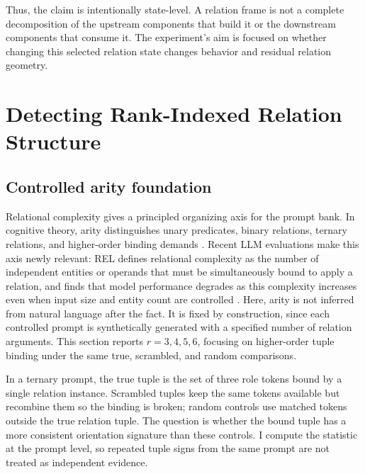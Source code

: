 \documentclass[11pt]{article}
\begin{document}
Thus, the claim is intentionally state-level. A relation frame is not a complete decomposition of the upstream components that build it or the downstream components that consume it. The experiment's aim is focused on whether changing this selected relation state changes behavior and residual relation geometry.

\endgroup

\FloatBarrier

\section{Detecting Rank-Indexed Relation Structure}

\subsection{Controlled arity foundation}

Relational complexity gives a principled organizing axis for the prompt bank. In cognitive theory, arity distinguishes unary predicates, binary relations, ternary relations, and higher-order binding demands \citep{halford1998relational,gentner1983structure}. Recent LLM evaluations make this axis newly relevant: REL defines relational complexity as the number of independent entities or operands that must be simultaneously bound to apply a relation, and finds that model performance degrades as this complexity increases even when input size and entity count are controlled \citep{fesser2026rel}. Here, arity is not inferred from natural language after the fact. It is fixed by construction, since each controlled prompt is synthetically generated with a specified number of relation arguments. This section reports $r=3,4,5,6$, focusing on higher-order tuple binding under the same true, scrambled, and random comparisons.

In a ternary prompt, the true tuple is the set of three role tokens bound by a single relation instance. Scrambled tuples keep the same tokens available but recombine them so the binding is broken; random controls use matched tokens outside the true relation tuple. The question is whether the bound tuple has a more consistent orientation signature than these controls. I compute the statistic at the prompt level, so repeated tuple signs from the same prompt are not treated as independent evidence.
\end{document}
